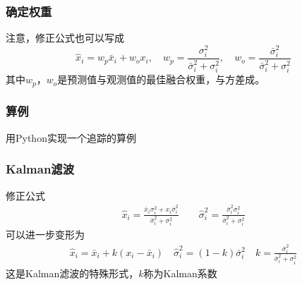 \documentclass[14pt]{beamer}
\let\emph\relax %
\begin{document}
\begin{frame}
  \frametitle{确定权重}
  注意，修正公式也可以写成
  $$\hat{x}_i=w_p\bar{x}_i+w_o x_i,\quad
  w_p=\frac{\sigma_i^2}{\bar{\sigma}_i^2+\sigma_i^2},\quad
  w_o=\frac{\bar{\sigma}_i^2}{\bar{\sigma}_i^2+\sigma_i^2}$$
  其中$w_p$，$w_o$是预测值与观测值的最佳融合权重，与方差成\emph{反比例}。
\end{frame}

\begin{frame}
  \frametitle{算例}
  用Python实现一个追踪的算例
\end{frame}

\begin{frame}
  \frametitle{Kalman滤波}
  修正公式
  \begin{align*}
    \hat{x}_i = \frac{\bar{x}_i\sigma_i^2+x_i\bar{\sigma}_i^2}
    {\bar{\sigma}_i^2+\sigma_i^2}\qquad\hat{\sigma}_i^2=
    \frac{\bar{\sigma}_i^2\sigma_i^2}{\bar{\sigma}_i^2+\sigma_i^2}
  \end{align*}
  可以进一步变形为
  \begin{align*}
    \hat{x}_i=\bar{x}_i+k(x_i-\bar{x}_i)\quad
    \hat{\sigma}_i^2=(1-k)\bar{\sigma}_i^2\quad
    k=\frac{\bar{\sigma}_i^2}{\bar{\sigma}_i^2+\sigma^2_i}
  \end{align*}
  这是Kalman滤波的特殊形式，$k$称为Kalman系数
\end{frame}
\end{document}
